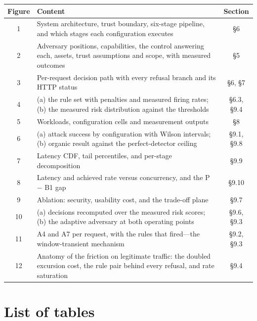 \begin{table}[h]
\centering
\small
\begin{tabular}{cp{4.6cm}c}
\toprule
Figure & Content & Section \\
\midrule
1 & System architecture, trust boundary, six-stage pipeline, and which stages each configuration executes & \S6 \\
2 & Adversary positions, capabilities, the control answering each, assets, trust assumptions and scope, with measured outcomes & \S5 \\
3 & Per-request decision path with every refusal branch and its HTTP status & \S6, \S7 \\
4 & (a) the rule set with penalties and measured firing rates; (b) the measured risk distribution against the thresholds & \S6.3, \S9.4 \\
5 & Workloads, configuration cells and measurement outputs & \S8 \\
6 & (a) attack success by configuration with Wilson intervals; (b) organic result against the perfect-detector ceiling & \S9.1, \S9.8 \\
7 & Latency CDF, tail percentiles, and per-stage decomposition & \S9.9 \\
8 & Latency and achieved rate versus concurrency, and the P $-$ B1 gap & \S9.10 \\
9 & Ablation: security, usability cost, and the trade-off plane & \S9.7 \\
10 & (a) decisions recomputed over the measured risk scores; (b) the adaptive adversary at both operating points & \S9.6, \S9.3 \\
11 & A4 and A7 per request, with the rules that fired---the window-transient mechanism & \S9.2, \S9.3 \\
12 & Anatomy of the friction on legitimate traffic: the doubled excursion cost, the rule pair behind every refusal, and rate saturation & \S9.4 \\
\bottomrule
\end{tabular}
\end{table}

\section*{List of tables}

